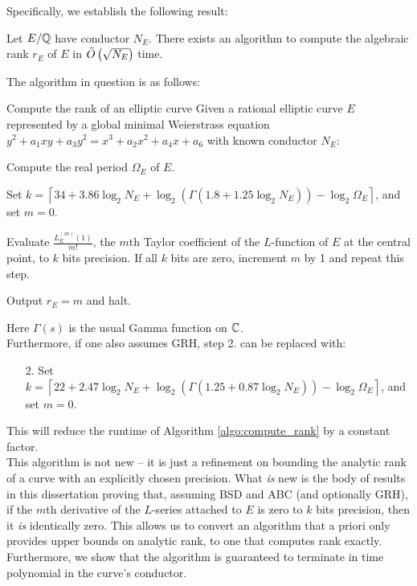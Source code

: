 Specifically, we establish the following result:
\begin{theorem}
\label{thm:main_theorem}
Let $E/\mathbb{Q}$ have conductor $N_E$. There exists an algorithm to compute the algebraic rank $r_E$ of $E$ in $\tilde{O}\left(\sqrt{N_E}\right)$ time.
\end{theorem}
The algorithm in question is as follows:
\begin{algorithm}{Compute the rank of an elliptic curve}\label{algo:compute_rank}
Given a rational elliptic curve $E$ represented by a global minimal Weierstrass equation $y^2 + a_1 xy + a_3 y^2 = x^3 + a_2 x^2 + a_4 x + a_6$ with known conductor $N_E$:
\begin{steps}
\item Compute the real period $\Omega_E$ of $E$.
\item Set $k = \left\lceil 34 + 3.86 \log_2 N_E + \log_2(\Gamma(1.8 + 1.25\log_2 N_E)) - \log_2 \Omega_E \right\rceil$, and set $m=0$.
\item Evaluate $\frac{L_E^{(m)}(1)}{m!}$, the $m$th Taylor coefficient of the $L$-function of $E$ at the central point, to $k$ bits precision. If all $k$ bits are zero, increment $m$ by 1 and repeat this step.
\item Output $r_E=m$ and halt.
\end{steps}
\end{algorithm}

Here $\Gamma(s)$ is the usual Gamma function on $\mathbb{C}$. \\
Furthermore, if one also assumes GRH, step 2. can be replaced with:
\begin{enumerate}
\item[2.] Set $k = \left\lceil 22 + 2.47 \log_2 N_E + \log_2(\Gamma(1.25 + 0.87 \log_2 N_E)) - \log_2 \Omega_E \right\rceil$, and set $m=0$.
\end{enumerate}
This will reduce the runtime of Algorithm \ref{algo:compute_rank} by a constant factor. \\

This algorithm is not new -- it is just a refinement on bounding the analytic rank of a curve with an explicitly chosen precision. What {\it is} new is the body of results in this dissertation proving that, assuming BSD and ABC (and optionally GRH), if the $m$th derivative of the $L$-series attached to $E$ is zero to $k$ bits precision, then it {\it is} identically zero. This allows us to convert an algorithm that a priori only provides upper bounds on analytic rank, to one that computes rank exactly. Furthermore, we show that the algorithm is guaranteed to terminate in time polynomial in the curve's conductor. \\

